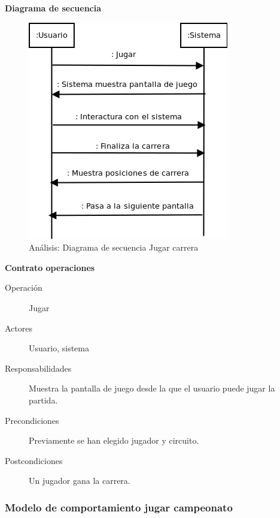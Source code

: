 \textbf{Diagrama de secuencia}
\begin{figure}[H]
  \label{dia_jugar}
  \begin{center}
    \includegraphics[scale=0.5]{imagenes/dia_jugar.png}
  \end{center}
  \caption{Análisis: Diagrama de secuencia Jugar carrera}
\end{figure}

\textbf{Contrato operaciones}

\begin{description}
    \item[Operación] Jugar
    \item[Actores] Usuario, sistema
    \item[Responsabilidades] Muestra la pantalla de juego desde la que el usuario puede jugar la partida.
    \item[Precondiciones] Previamente se han elegido jugador y circuito.
    \item[Postcondiciones] Un jugador gana la carrera.
\end{description}

\subsubsection{Modelo de comportamiento jugar campeonato}

